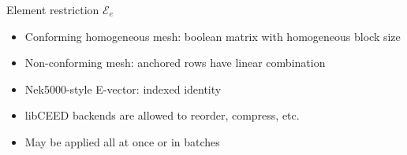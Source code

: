 \documentclass[aspectratio=169]{beamer}
\begin{document}

\begin{frame}{Element restriction $\mathcal E_e$}
  \begin{itemize}
  \item Conforming homogeneous mesh: boolean matrix with homogeneous block size
  \item Non-conforming mesh: anchored rows have linear combination
  \item Nek5000-style E-vector: indexed identity
  \item libCEED backends are allowed to reorder, compress, etc.
  \item May be applied all at once or in batches
  \end{itemize}
\end{frame}
\end{document}
